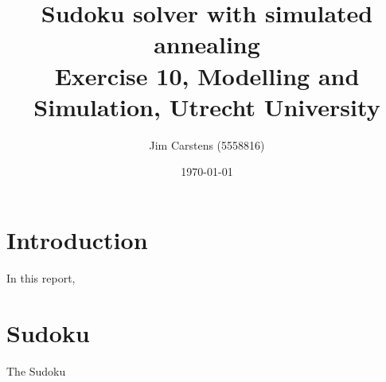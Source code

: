 \documentclass[a4paper]{article}
\title{\textbf{Sudoku solver with simulated annealing} \\\large{Exercise 10, Modelling and Simulation, Utrecht University}}
\author{Jim Carstens (5558816)}
\date{\today}
\begin{document}
\maketitle
\hrulefill
\tableofcontents
\hrulefill
\section*{Introduction}
In this report, 

\section{Sudoku}  \label{sec:c}
The Sudoku



\end{document}
